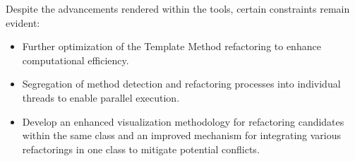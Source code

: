 Despite the advancements rendered within the tools, certain constraints remain evident:
\begin{itemize}
  \item Further optimization of the Template Method refactoring to enhance computational efficiency. 
  \item Segregation of method detection and refactoring processes into individual threads to enable parallel execution.
  \item Develop an enhanced visualization methodology for refactoring candidates within the same class and an improved mechanism for integrating various refactorings in one class to mitigate potential conflicts.
\end{itemize}